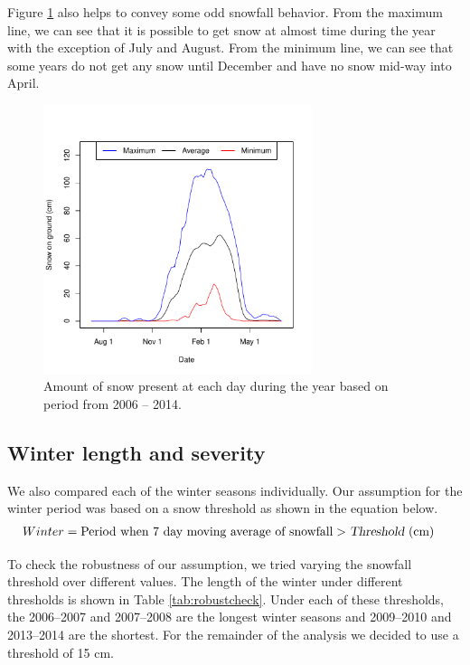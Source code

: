 \documentclass[12pt,twoside]{article}
\begin{document}
{Figure \ref{fig:averagetsplot} also helps to convey some odd snowfall behavior. From the maximum line, we can see that it is possible to get snow at almost time during the year with the exception of July and August. From the minimum line, we can see that some years do not get any snow until December and have no snow mid-way into April.


\begin{figure}[!ht]
\begin{center}
\includegraphics[width=0.7\textwidth]{report-averagetsplot}
\end{center}
\vspace{-8mm}
\caption{Amount of snow present at each day during the year based on period from 2006 -- 2014.}
\label{fig:averagetsplot}
\end{figure}

\subsection{Winter length and severity}

We also compared each of the winter seasons individually. Our assumption for the winter period was based on a snow threshold as shown in the equation below.
%
\begin{align*}
Winter &= \text{Period when } \text{7 day moving average of} \text{ snowfall} > \textsl{Threshold} \text{ (cm)}
\end{align*}

\medskip To check the robustness of our assumption, we tried varying the snowfall threshold over different values. The length of the winter under different thresholds is shown in Table \ref{tab:robustcheck}. Under each of these thresholds, the 2006--2007 and 2007--2008 are the longest winter seasons and 2009--2010 and 2013--2014 are the shortest. For the remainder of the analysis we decided to use a threshold of 15 cm.

}
\end{document}
